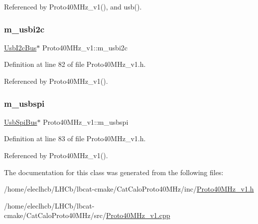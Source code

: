 Referenced by Proto40\+M\+Hz\+\_\+v1(), and usb().

\mbox{\label{classProto40MHz__v1_ae4f9dc7b1549d4ef43e1e6b35f28d41d}} 
\subsubsection{\texorpdfstring{m\+\_\+usbi2c}{m\_usbi2c}}
{\footnotesize\ttfamily \hyperlink{classUsbI2cBus}{Usb\+I2c\+Bus}$\ast$ Proto40\+M\+Hz\+\_\+v1\+::m\+\_\+usbi2c\hspace{0.3cm}{\ttfamily [private]}}



Definition at line 82 of file Proto40\+M\+Hz\+\_\+v1.\+h.



Referenced by Proto40\+M\+Hz\+\_\+v1().

\mbox{\label{classProto40MHz__v1_a3539294876a0bd775da282777d2091ca}} 
\subsubsection{\texorpdfstring{m\+\_\+usbspi}{m\_usbspi}}
{\footnotesize\ttfamily \hyperlink{classUsbSpiBus}{Usb\+Spi\+Bus}$\ast$ Proto40\+M\+Hz\+\_\+v1\+::m\+\_\+usbspi\hspace{0.3cm}{\ttfamily [private]}}



Definition at line 83 of file Proto40\+M\+Hz\+\_\+v1.\+h.



Referenced by Proto40\+M\+Hz\+\_\+v1().



The documentation for this class was generated from the following files\+:\begin{DoxyCompactItemize}
\item 
/home/eleclhcb/\+L\+H\+Cb/lbcat-\/cmake/\+Cat\+Calo\+Proto40\+M\+Hz/inc/\hyperlink{Proto40MHz__v1_8h}{Proto40\+M\+Hz\+\_\+v1.\+h}\item 
/home/eleclhcb/\+L\+H\+Cb/lbcat-\/cmake/\+Cat\+Calo\+Proto40\+M\+Hz/src/\hyperlink{Proto40MHz__v1_8cpp}{Proto40\+M\+Hz\+\_\+v1.\+cpp}\end{DoxyCompactItemize}
